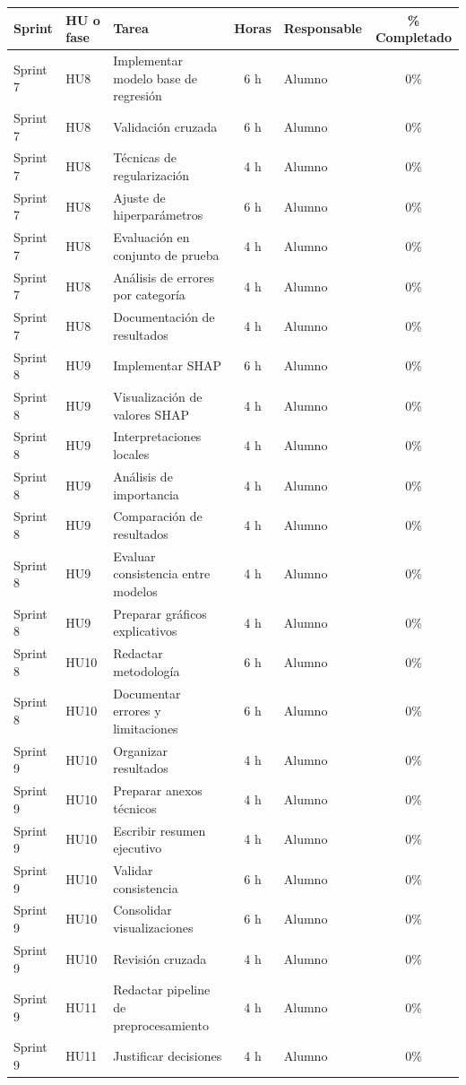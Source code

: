 \documentclass[
11pt, %
]{charter}
\begin{document}
\begin{table}[htpb]
\centering
\begin{tabularx}{\linewidth}{@{}|l|l|X|c|l|c|@{}}
\hline
\rowcolor[HTML]{C0C0C0}
Sprint & HU o fase & Tarea & Horas & Responsable & \% Completado \\ \hline

Sprint 7 & HU8 & Implementar modelo base de regresión & 6 h & Alumno & 0\% \\ \hline
Sprint 7 & HU8 & Validación cruzada & 6 h & Alumno & 0\% \\ \hline
Sprint 7 & HU8 & Técnicas de regularización & 4 h & Alumno & 0\% \\ \hline
Sprint 7 & HU8 & Ajuste de hiperparámetros & 6 h & Alumno & 0\% \\ \hline
Sprint 7 & HU8 & Evaluación en conjunto de prueba & 4 h & Alumno & 0\% \\ \hline
Sprint 7 & HU8 & Análisis de errores por categoría & 4 h & Alumno & 0\% \\ \hline
Sprint 7 & HU8 & Documentación de resultados & 4 h & Alumno & 0\% \\ \hline

Sprint 8 & HU9 & Implementar SHAP & 6 h & Alumno & 0\% \\ \hline
Sprint 8 & HU9 & Visualización de valores SHAP & 4 h & Alumno & 0\% \\ \hline
Sprint 8 & HU9 & Interpretaciones locales & 4 h & Alumno & 0\% \\ \hline
Sprint 8 & HU9 & Análisis de importancia & 4 h & Alumno & 0\% \\ \hline
Sprint 8 & HU9 & Comparación de resultados & 4 h & Alumno & 0\% \\ \hline
Sprint 8 & HU9 & Evaluar consistencia entre modelos & 4 h & Alumno & 0\% \\ \hline
Sprint 8 & HU9 & Preparar gráficos explicativos & 4 h & Alumno & 0\% \\ \hline
Sprint 8 & HU10 & Redactar metodología & 6 h & Alumno & 0\% \\ \hline
Sprint 8 & HU10 & Documentar errores y limitaciones & 6 h & Alumno & 0\% \\ \hline

Sprint 9 & HU10 & Organizar resultados & 4 h & Alumno & 0\% \\ \hline
Sprint 9 & HU10 & Preparar anexos técnicos & 4 h & Alumno & 0\% \\ \hline
Sprint 9 & HU10 & Escribir resumen ejecutivo & 4 h & Alumno & 0\% \\ \hline
Sprint 9 & HU10 & Validar consistencia & 6 h & Alumno & 0\% \\ \hline
Sprint 9 & HU10 & Consolidar visualizaciones & 6 h & Alumno & 0\% \\ \hline
Sprint 9 & HU10 & Revisión cruzada & 4 h & Alumno & 0\% \\ \hline
Sprint 9 & HU11 & Redactar pipeline de preprocesamiento & 4 h & Alumno & 0\% \\ \hline
Sprint 9 & HU11 & Justificar decisiones & 4 h & Alumno & 0\% \\ \hline


\end{tabularx}
\end{table}
\end{document}
